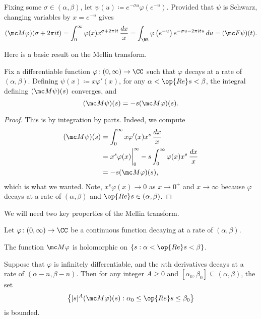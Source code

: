 \documentclass[../notes.tex]{subfiles}
\begin{document}
\begin{remark} \label{rem:mellin-to-fourier}
	Fixing some $\sigma\in(\alpha,\beta)$, let $\psi(u)\coloneqq e^{-\sigma u}\varphi\left(e^{-u}\right)$. Provided that $\psi$ is Schwarz, changing variables by $x=e^{-u}$ gives
	\[(\mc M\varphi)(\sigma+2\pi it)=\int_0^\infty\varphi(x)x^{\sigma+2\pi it}\,\frac{dx}x=\int_\RR\varphi\left(e^{-u}\right)e^{-\sigma u-2\pi itu}\,du=(\mc F\psi)(t).\]
\end{remark}
Here is a basic result on the Mellin transform.
\begin{lemma} \label{lem:deriv-mellin-transform}
	Fix a differentiable function $\varphi\colon(0,\infty)\to\CC$ such that $\varphi$ decays at a rate of $(\alpha,\beta)$. Defining $\psi(x)\coloneqq x\varphi'(x)$, for any $\alpha<\op{Re}s<\beta$, the integral defining $(\mc M\psi)(s)$ converges, and
	\[(\mc M\psi)(s)=-s(\mc M\varphi)(s).\]
\end{lemma}
\begin{proof}
	This is by integration by parts. Indeed, we compute
	\begin{align*}
		(\mc M\psi)(s) &= \int_0^\infty x\varphi'(x)x^s\,\frac{dx}x \\
		&= x^s\varphi(x)\bigg|_0^\infty-s\int_0^\infty\varphi(x)x^s\,\frac{dx}x \\
		&= -s(\mc M\varphi)(s),
	\end{align*}
	which is what we wanted. Note, $x^s\varphi(x)\to0$ as $x\to0^+$ and $x\to\infty$ because $\varphi$ decays at a rate of $(\alpha,\beta)$ and $\op{Re}s\in(\alpha,\beta)$.
\end{proof}
We will need two key properties of the Mellin transform.
\begin{proposition} \label{prop:bound-mellin-transform}
	Let $\varphi\colon(0,\infty)\to\CC$ be a continuous function decaying at a rate of $(\alpha,\beta)$. 
	\begin{listalph}
		\item The function $\mc M\varphi$ is holomorphic on $\{s:\alpha<\op{Re}s<\beta\}$.
		\item Suppose that $\varphi$ is infinitely differentiable, and the $n$th derivatives decays at a rate of $(\alpha-n,\beta-n)$. Then for any integer $A\ge0$ and $[\alpha_0,\beta_0]\subseteq(\alpha,\beta)$, the set
		\[\left\{|s|^A(\mc M\varphi)(s):\alpha_0\le\op{Re}s\le\beta_0\right\}\]
		is bounded.
	\end{listalph}
\end{proposition}
\end{document}
